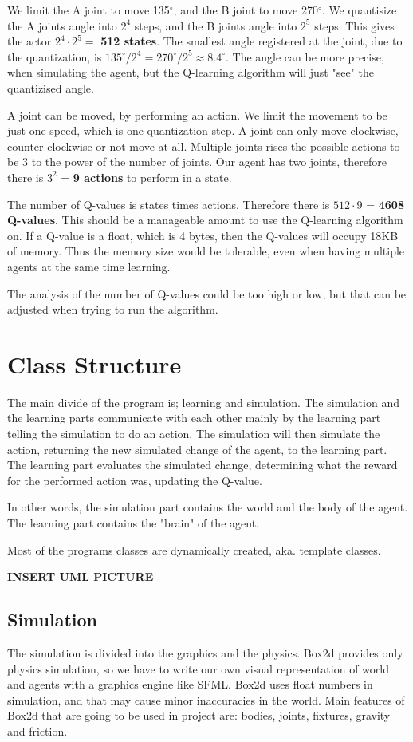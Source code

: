 \documentclass{article}
\begin{document}
We limit the A joint to move 135$^\circ$, and the B joint to move
270$^\circ$. We quantisize the A joints angle into $2^4$ steps, and
the B joints angle into $2^5$ steps. This gives the actor
$2^4 \cdot 2^5 =$ \textbf{512 states}. The smallest angle registered at
the joint, due to the quantization, is
$135^\circ / 2^4 = 270^\circ / 2^5 \approx 8.4^\circ$.
The angle can be more precise, when simulating the agent, but the
Q-learning algorithm will just "see" the quantizised angle.

A joint can be moved, by performing an action. We limit the movement to be
just one speed, which is one quantization step. A joint can only move
clockwise, counter-clockwise or not move at all. Multiple joints rises the
possible actions to be 3 to the power of the number of joints. Our
agent has two joints, therefore there is $3^2$ = \textbf{9 actions} to
perform in a state.

The number of Q-values is states times actions. Therefore there is
$512 \cdot 9$ = \textbf{4608 Q-values}. This should be a manageable
amount to use the Q-learning algorithm on. If a Q-value is a float,
which is 4 bytes, then the Q-values will occupy 18KB of memory.
Thus the memory size would be tolerable, even when having multiple agents
at the same time learning.

The analysis of the number of Q-values could be too high or low, but that
can be adjusted when trying to run the algorithm.



\section{Class Structure}
The main divide of the program is; learning and simulation. The
simulation and the learning parts communicate with each other mainly by the
learning part telling the simulation to do an action. The simulation will then
simulate the action, returning the new simulated change of the agent, to the
learning part. The learning part evaluates the simulated change, determining
what the reward for the performed action was, updating the Q-value.

In other words, the simulation part contains the world and the body of the agent.
The learning part contains the "brain" of the agent.

Most of the programs classes are dynamically created, aka. template classes.

\textbf{INSERT UML PICTURE}


\subsection{Simulation}
The simulation is divided into the graphics and the physics. Box2d provides only physics simulation, 
so we have to write our own visual representation of world and agents with a graphics engine like SFML.
Box2d uses float numbers in simulation, and that may cause minor inaccuracies in the world.
Main features of Box2d that are going to be used in project are: bodies, joints, fixtures, gravity and friction.
\end{document}
